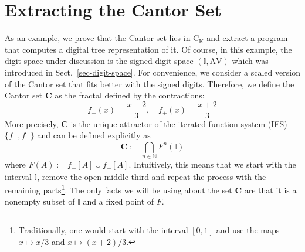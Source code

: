 \documentclass[microtype]{jloganal}
\theoremstyle{plain}
\theoremstyle{definition}
\newcommand{\II}{\mathbb{I}}
\newcommand{\NN}{\mathbb{N}}
\newcommand{\AV}{\mathrm{AV}}
\newcommand{\coco}{\mathrm{C}}
\newcommand{\compact}{\mathrm{K}}
\newcommand{\cantor}{\mathbf{C}}
\newcommand{\fminus}{f_{-}}
\newcommand{\fplus}{f_{+}}
\begin{document}
\section{Extracting the Cantor Set}
\label{sec-cantor}
As an example, we prove that the Cantor set  
lies in $\coco_{\compact}$ and extract a program
that computes a digital tree representation of it.
Of course, in this example, the digit space under discussion is the signed
digit space $(\II,\AV)$ which was introduced in Sect.~\ref{sec-digit-space}.
For convenience, we consider a scaled version of the Cantor set 
that fits better with
the signed digits. Therefore, we define the Cantor set $\cantor$
as the fractal defined by the contractions: 
\[\fminus(x) = \frac{x-2}{3}, \quad \fplus(x) = \frac{x+2}{3}\]
More precisely, $\cantor$ is the unique attractor of the iterated 
function system (IFS) $\{\fminus,\fplus\}$ and can be defined explicitly
as
\[\cantor := \bigcap_{n\in\NN} F^n(\II) \]
where $F(A) := \fminus[A] \cup \fplus[A]$.
Intuitively, this means that we start with the interval $\II$,
remove the open middle third and repeat the process with the 
remaining parts\footnote{Traditionally, one would start with the interval $[0,1]$
and use the maps $x\mapsto x/3$ and $x\mapsto(x+2)/3$.}.
The only facts we will be using about the set $\cantor$ are that 
it is a nonempty subset of $\II$ and a fixed point of $F$.
\end{document}
